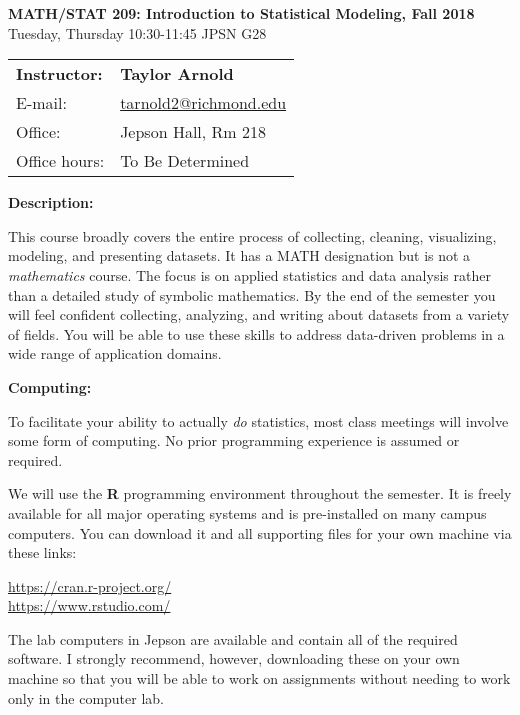 \documentclass[12pt]{article}
\begin{document}
\begin{center}
{\bf MATH/STAT 209: Introduction to Statistical Modeling, Fall 2018} \\
Tuesday, Thursday 10:30-11:45 \quad JPSN G28\\
\end{center}

\bigskip

\noindent
\begin{tabular}{ l l }
{\bf Instructor:} &  {\bf Taylor Arnold} \\
E-mail: & \href{mailto:tarnold2@richmond.edu}{tarnold2@richmond.edu} \\
Office: & Jepson Hall, Rm 218 \\
Office hours: & To Be Determined\\
\end{tabular}

\vspace{0.5cm}

\textbf{Description:} \vspace{6pt}

This course broadly covers the entire process of collecting,
cleaning, visualizing, modeling, and presenting datasets. It
has a MATH designation but is not a \textit{mathematics} course.
The focus is on applied statistics and data analysis
rather than a detailed study of symbolic mathematics. By the end
of the semester you will feel confident collecting, analyzing,
and writing about datasets from a variety of fields. You will be
able to use these skills to address data-driven problems in a wide
range of application domains.

\bigskip

\textbf{Computing:} \vspace{6pt}

To facilitate your ability to actually \textit{do} statistics,
most class meetings will involve some form of computing.
No prior programming experience is assumed or required.

\medskip

We will use the \textbf{R} programming environment throughout the
semester. It is freely available for all major operating systems and
is pre-installed on many campus computers. You can download it and
all supporting files for your own machine via these links:
\begin{center}
\url{https://cran.r-project.org/} \\
\url{https://www.rstudio.com/}
\end{center}
The lab computers in Jepson are available and contain all of the
required software. I strongly recommend, however, downloading these
on your own machine so that you will be able to work on assignments
without needing to work only in the computer lab.
\end{document}
